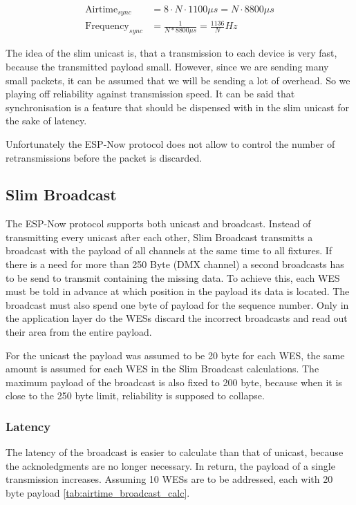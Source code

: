 \begin{align} 
	\text{Airtime}_{sync} &= 8 \cdot N \cdot 1100\mu s = N \cdot 8800\mu s \\
	\text{Frequency}_{sync} &= \frac{1}{N * 8800\mu s} = \frac{1136}{N} Hz
\end{align} 

The idea of the slim unicast is, that a transmission to each device is very fast, because the transmitted payload small.
However, since we are sending many small packets, it can be assumed that we will be sending a lot of overhead.
So we playing off reliability against transmission speed.
It can be said that synchronisation is a feature that should be dispensed with in the slim unicast for the sake of latency.

Unfortunately the ESP-Now protocol does not allow to control the number of retransmissions before the packet is discarded.

\subsection*{Slim Broadcast}

The ESP-Now protocol supports both unicast and broadcast.
Instead of transmitting every unicast after each other, 
Slim Broadcast transmitts a broadcast with the payload of all channels at the same time to all fixtures.
If there is a need for more than 250 Byte (DMX channel) a second broadcasts has to be send to transmit containing the missing data.
To achieve this, each WES must be told in advance at which position in the payload its data is located.
The broadcast must also spend one byte of payload for the sequence number.
Only in the application layer do the WESs discard the incorrect broadcasts and read out their area from the entire payload.

For the unicast the payload was assumed to be 20 byte for each WES, the same amount is assumed for each WES in the Slim Broadcast calculations.
The maximum payload of the broadcast is also fixed to 200 byte, because when it is close to the 250 byte limit, 
reliability is supposed to collapse.

\subsubsection*{Latency}

The latency of the broadcast is easier to calculate than that of unicast, because the acknoledgments are no longer necessary.
In return, the payload of a single transmission increases.
Assuming 10 WESs are to be addressed, each with 20 byte payload \ref{tab:airtime_broadcast_calc}.

